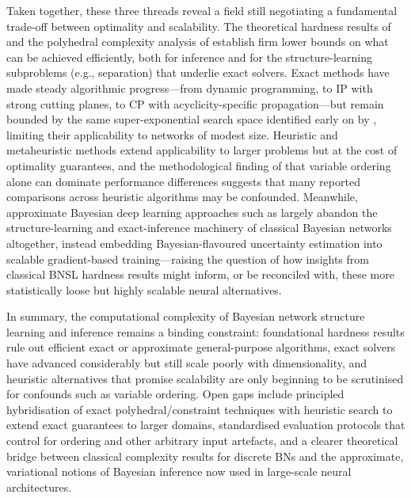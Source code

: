 Taken together, these three threads reveal a field still negotiating a fundamental trade-off between optimality and scalability. The theoretical hardness results of \cite{dagum1993approximating} and the polyhedral complexity analysis of \cite{cussens2017bayesian} establish firm lower bounds on what can be achieved efficiently, both for inference and for the structure-learning subproblems (e.g., separation) that underlie exact solvers. Exact methods \cite{singh2018finding,cussens2017bayesian,trosser2021improved} have made steady algorithmic progress---from dynamic programming, to IP with strong cutting planes, to CP with acyclicity-specific propagation---but remain bounded by the same super-exponential search space identified early on by \cite{zhou2011structure}, limiting their applicability to networks of modest size. Heuristic and metaheuristic methods \cite{sun2025bayesian} extend applicability to larger problems but at the cost of optimality guarantees, and the methodological finding of \cite{kitson2024impact} that variable ordering alone can dominate performance differences suggests that many reported comparisons across heuristic algorithms may be confounded. Meanwhile, approximate Bayesian deep learning approaches such as \cite{gal2015bayesian} largely abandon the structure-learning and exact-inference machinery of classical Bayesian networks altogether, instead embedding Bayesian-flavoured uncertainty estimation into scalable gradient-based training---raising the question of how insights from classical BNSL hardness results might inform, or be reconciled with, these more statistically loose but highly scalable neural alternatives.

In summary, the computational complexity of Bayesian network structure learning and inference remains a binding constraint: foundational hardness results rule out efficient exact or approximate general-purpose algorithms, exact solvers have advanced considerably but still scale poorly with dimensionality, and heuristic alternatives that promise scalability are only beginning to be scrutinised for confounds such as variable ordering. Open gaps include principled hybridisation of exact polyhedral/constraint techniques with heuristic search to extend exact guarantees to larger domains, standardised evaluation protocols that control for ordering and other arbitrary input artefacts, and a clearer theoretical bridge between classical complexity results for discrete BNs and the approximate, variational notions of Bayesian inference now used in large-scale neural architectures.

